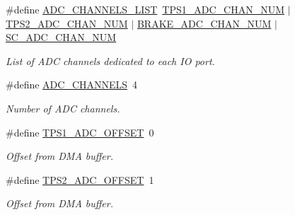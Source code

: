 \begin{DoxyCompactItemize}
\mbox{\label{group___board__model__group_ga8b6fbd5b46174be3b86bc1ab5daa9080}} 
\#define \mbox{\hyperlink{group___board__model__group_ga8b6fbd5b46174be3b86bc1ab5daa9080}{A\+D\+C\+\_\+\+C\+H\+A\+N\+N\+E\+L\+S\+\_\+\+L\+I\+ST}}~\mbox{\hyperlink{group___board__model__group_ga99b2a7dadaf495e3c559a46440f9141f}{T\+P\+S1\+\_\+\+A\+D\+C\+\_\+\+C\+H\+A\+N\+\_\+\+N\+UM}} $\vert$ \mbox{\hyperlink{group___board__model__group_ga4cecb8c10512873904099a1a88d69ed3}{T\+P\+S2\+\_\+\+A\+D\+C\+\_\+\+C\+H\+A\+N\+\_\+\+N\+UM}} $\vert$ \mbox{\hyperlink{group___board__model__group_ga310547321c4a016c4ad19922920fadfd}{B\+R\+A\+K\+E\+\_\+\+A\+D\+C\+\_\+\+C\+H\+A\+N\+\_\+\+N\+UM}} $\vert$ \mbox{\hyperlink{group___board__model__group_ga564adb575db2620ac85e3abdd6a5bbaf}{S\+C\+\_\+\+A\+D\+C\+\_\+\+C\+H\+A\+N\+\_\+\+N\+UM}}
\begin{DoxyCompactList}\small\item\em List of A\+DC channels dedicated to each IO port. \end{DoxyCompactList}\item 
\mbox{\label{group___board__model__group_ga065dcfa648ca52ed6214008cb177de36}} 
\#define \mbox{\hyperlink{group___board__model__group_ga065dcfa648ca52ed6214008cb177de36}{A\+D\+C\+\_\+\+C\+H\+A\+N\+N\+E\+LS}}~4
\begin{DoxyCompactList}\small\item\em Number of A\+DC channels. \end{DoxyCompactList}\item 
\mbox{\label{group___board__model__group_ga7ce02d79fba23321a377a26a963e2bdf}} 
\#define \mbox{\hyperlink{group___board__model__group_ga7ce02d79fba23321a377a26a963e2bdf}{T\+P\+S1\+\_\+\+A\+D\+C\+\_\+\+O\+F\+F\+S\+ET}}~0
\begin{DoxyCompactList}\small\item\em Offset from D\+MA buffer. \end{DoxyCompactList}\item 
\mbox{\label{group___board__model__group_ga24019e59e805c7acf8f816e141d3d689}} 
\#define \mbox{\hyperlink{group___board__model__group_ga24019e59e805c7acf8f816e141d3d689}{T\+P\+S2\+\_\+\+A\+D\+C\+\_\+\+O\+F\+F\+S\+ET}}~1
\begin{DoxyCompactList}\small\item\em Offset from D\+MA buffer. \end{DoxyCompactList}\item 

\end{DoxyCompactItemize}
